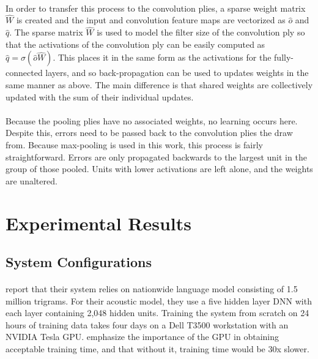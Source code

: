 \documentclass[letterpaper]{article}
\begin{document}
\paragraph{} In order to transfer this process to the convolution plies, a sparse weight matrix $\hat{W}$ is created and the input and convolution feature maps are vectorized as $\hat{o}$ and $\hat{q}$. The sparse matrix $\hat{W}$ is used to model the filter size of the convolution ply so that the activations of the convolution ply can be easily computed as $\hat{q} = \sigma (\hat{o}\hat{W})$. This places it in the same form as the activations for the fully-connected layers, and so back-propagation can be used to updates weights in the same manner as above. The main difference is that shared weights are collectively updated with the sum of their individual updates.

\paragraph{} Because the pooling plies have no associated weights, no learning occurs here. Despite this, errors need to be passed back to the convolution plies the draw from. Because max-pooling is used in this work, this process is fairly straightforward. Errors are only propagated backwards to the largest unit in the group of those pooled. Units with lower activations are left alone, and the weights are unaltered.

\section*{Experimental Results} 

\subsection*{System Configurations}

\paragraph{} \cite{DBLP:journals/taslp/DahlYDA12} report that their system relies on nationwide language model consisting of 1.5 million trigrams. For their acoustic model, they use a five hidden layer DNN with each layer containing 2,048 hidden units. Training the system from scratch on 24 hours of training data takes four days on a Dell T3500 workstation with an NVIDIA Tesla GPU. \cite{DBLP:journals/taslp/DahlYDA12} emphasize the importance of the GPU in obtaining acceptable training time, and that without it, training time would be 30x slower.
\end{document}
